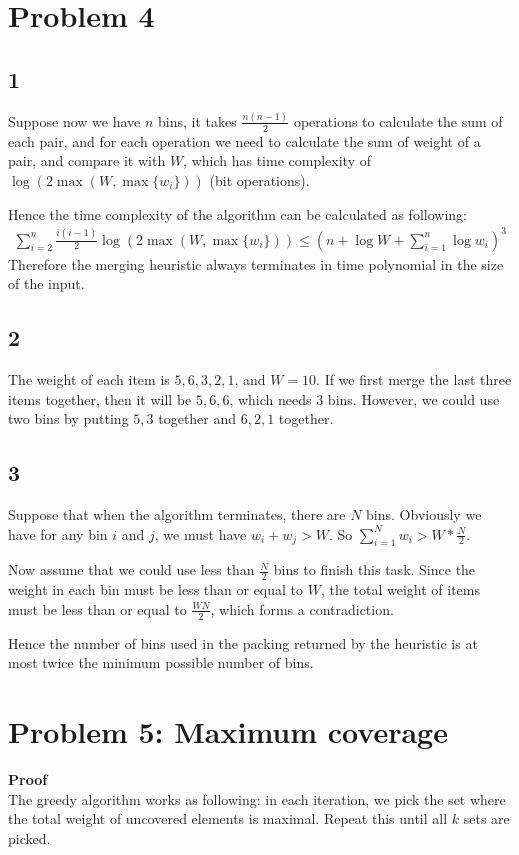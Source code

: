 \documentclass{article}
\newcommand{\Proof}{\vspace{0.3cm} \noindent\textbf{Proof} \\}
\begin{document}
\section*{Problem 4}

\subsection*{1}
Suppose now we have $n$ bins, it takes $\frac{n(n-1)}{2}$ operations to calculate the sum of each
pair, and for each operation we need to calculate the sum of weight of a pair, and compare it with
$W$, which has time complexity of $\log(2 \max(W, \max \{w_i\}))$ (bit operations).

Hence the time complexity of the algorithm can be calculated as following:
\begin{align}
  \sum_{i = 2}^{n} \frac{i(i-1)}{2} \log(2 \max (W, \max \{w_i\})) \leq (n + \log W + \sum_{i=1}^{n}
  \log w_i)^3
\end{align}
Therefore the
merging heuristic always terminates in time polynomial in the size of the input.

\subsection*{2}
The weight of each item is $5, 6, 3, 2, 1$, and $W = 10$. If we first merge the last three items
together, then it will be $5, 6, 6$, which needs $3$ bins. However, we could use two bins by putting
$5, 3$ together and $6, 2, 1$ together.

\subsection*{3}
Suppose that when the algorithm terminates, there are $N$ bins. Obviously we have for any bin $i$
and $j$, we must have $w_i + w_j > W$. So $\sum_{i=1}^{N} w_i > W * \frac{N}{2}$.

Now assume that we could use less than $\frac{N}{2}$ bins to finish this task. Since the weight in
each bin must be less than or equal to $W$, the total weight of items must be less than or equal to 
$\frac{WN}{2}$, which forms a contradiction. 

Hence the number of bins used in the
packing returned by the heuristic is at most twice the minimum possible number of bins.

\section*{Problem 5: Maximum coverage}
\Proof
The greedy algorithm works as following: in each iteration, we pick the set where the total weight
of uncovered elements is maximal. Repeat this until all $k$ sets are picked. 
\end{document}
